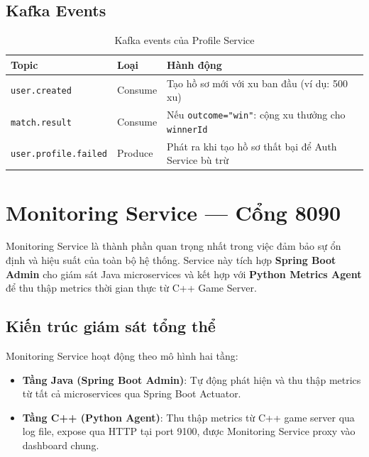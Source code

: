 \documentclass[12pt,a4paper]{report}
\newcommand{\topic}[1]{\texttt{\textcolor{micropurple}{#1}}}
\begin{document}
\subsection{Kafka Events}

\begin{table}[H]
\centering
\caption{Kafka events của Profile Service}
\label{tab:profilekafka}
\begin{tabularx}{\textwidth}{llX}
\toprule
\textbf{Topic} & \textbf{Loại} & \textbf{Hành động} \\
\midrule
\topic{user.created}        & Consume & Tạo hồ sơ mới với xu ban đầu (ví dụ: 500 xu) \\
\topic{match.result}        & Consume & Nếu \texttt{outcome="win"}: cộng xu thưởng cho \texttt{winnerId} \\
\topic{user.profile.failed} & Produce & Phát ra khi tạo hồ sơ thất bại để Auth Service bù trừ \\
\bottomrule
\end{tabularx}
\end{table}

\section{Monitoring Service --- Cổng 8090}

Monitoring Service là thành phần quan trọng nhất trong việc đảm bảo sự ổn định và hiệu suất của toàn bộ hệ thống. Service này tích hợp \textbf{Spring Boot Admin} cho giám sát Java microservices và kết hợp với \textbf{Python Metrics Agent} để thu thập metrics thời gian thực từ C++ Game Server.

\subsection{Kiến trúc giám sát tổng thể}

Monitoring Service hoạt động theo mô hình hai tầng:

\begin{itemize}
  \item \textbf{Tầng Java (Spring Boot Admin)}: Tự động phát hiện và thu thập metrics từ tất cả microservices qua Spring Boot Actuator.
  \item \textbf{Tầng C++ (Python Agent)}: Thu thập metrics từ C++ game server qua log file, expose qua HTTP tại port 9100, được Monitoring Service proxy vào dashboard chung.
\end{itemize}
\end{document}
